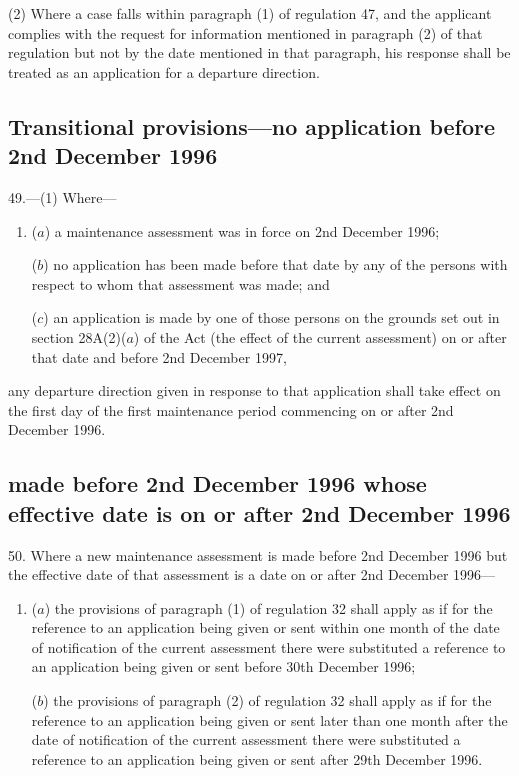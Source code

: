\documentclass[12pt,a4paper]{article}
\begin{document}
(2) Where a case falls within paragraph (1) of regulation 47, and the applicant
complies with the request for information mentioned in paragraph (2) of that
regulation but not by the date mentioned in that paragraph, his response shall
be treated as an application for a departure direction.

\subsection[49. Transitional provisions—no application before 2nd December 1996]{Transitional provisions—no application before 2nd December 1996}

49.—(1) Where—
\begin{enumerate}\item[]
($a$) a maintenance assessment was in force on 2nd December 1996;

($b$) no application has been made before that date by any of the persons with
respect to whom that assessment was made; and

($c$) an application is made by one of those persons on the grounds set out in
section 28A(2)($a$) of the Act (the effect of the current assessment) on or after
that date and before 2nd December 1997,
\end{enumerate}
any departure direction given in response to that application shall take effect
on the first day of the first maintenance period commencing on or after 2nd
December 1996.

\subsection[50. Transitional provisions—new maintenance assessment made before 2nd December 1996 whose effective date is on or after 2nd December 1996]{\sloppy {} made before 2nd December 1996 whose effective date is on or after 2nd December 1996}

50. Where a new maintenance assessment is made before 2nd December 1996 but the effective date of that assessment is a date on or after 2nd December 1996—
\begin{enumerate}\item[]
($a$) the provisions of paragraph (1) of regulation 32 shall apply as if for the reference to an application being given or sent within 
one month  %
of the date of notification of the current assessment there were substituted a reference to an application being given or sent before 30th December 1996;

($b$) the provisions of paragraph (2) of regulation 32 shall apply as if for the reference to an application being given or sent later than 
one month  %
after the date of notification of the current assessment there were substituted a reference to an application being given or sent after 29th December 1996.
\end{enumerate}
\end{document}
